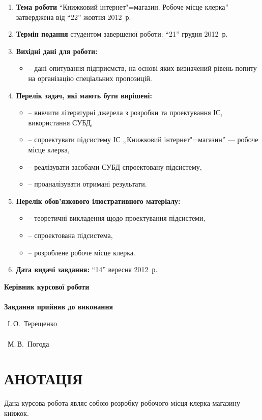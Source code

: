 \documentclass[a4paper,notitlepage,headsepline,pdftex,oneside]{report}
\newcommand{\setfontsize}[1]{\fontsize{#1pt}{#1pt}\selectfont}
\newcommand{\uChapter}[1]{\chapter*{#1}\pagestyle{fancy}\renewcommand{\baselinestretch}{1.5}\setfontsize{14pt}}
\newenvironment{enumerator}{\begin{enumerate}[leftmargin=1.6cm]%
  \setlength{\itemsep}{1pt}%
  \setlength{\parskip}{0pt}
  \setlength{\parsep}{0pt}
  }{\end{enumerate}}
\newenvironment{itemizer}{\begin{itemize}[leftmargin=1.45cm]%
  \setlength{\itemsep}{1pt}%
  \setlength{\parskip}{0pt}
  \setlength{\parsep}{0pt}
  }{\end{itemize}}
\begin{document}
\begin{enumerator}
  \item \textbf{Тема роботи} ``Книжковий інтернет"=магазин. Робоче місце
    клерка'' затверджена від ``22'' жовтня 2012~р.
  \item \textbf{Термін подання} студентом завершеної роботи: ``21'' грудня
    2012~р.
  \item \textbf{Вихідні дані для роботи:}
    \begin{itemizer}
      \item[--] дані опитування підприємств, на основі яких визначений рівень
        попиту на організацію спеціальних пропозицій.
    \end{itemizer}
  \item \textbf{Перелік задач, які мають бути вирішені:}
    \begin{itemizer}
      \item[--] вивчити літературні джерела з розробки та проектування ІС,
        використання СУБД,
      \item[--] спроектувати підсистему ІС ,,Книжковий інтернет"=магазин'' ---
        робоче місце клерка,
      \item[--] реалізувати засобами СУБД спроектовану підсистему,
      \item[--] проаналізувати отримані результати.
    \end{itemizer}
  \item \textbf{Перелік обов’язкового ілюстративного матеріалу:}
    \begin{itemizer}
      \item[--] теоретичні викладення щодо проектування підсистеми,
      \item[--] спроектована підсистема,
      \item[--] розроблене робоче місце клерка.
    \end{itemizer}
  \item \textbf{Дата видачі завдання:} ``14'' вересня 2012~р.
\end{enumerator}

\vspace{1cm}

\begin{minipage}{0.55\textwidth}
  \bf
  \noindent
  Керівник курсової роботи\\
  \hspace{1cm}\\
  \noindent
  Завдання прийняв до виконання
\end{minipage}
\begin{minipage}{0.45\textwidth}
  \noindent\underline{\hspace{5em}}~І.\,О.~Терещенко\\
  \hspace{1cm}\\
  \noindent\underline{\hspace{5em}}~М.\,В.~Погода
\end{minipage}
\thispagestyle{empty}
\clearpage
\uChapter{АНОТАЦІЯ}
  Дана курсова робота являє собою розробку робочого місця клерка магазину
  книжок.
\end{document}
